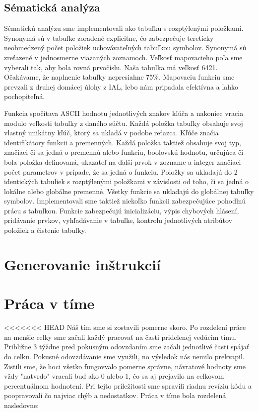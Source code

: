 \documentclass [11pt, a4paper]{article}
\begin{document}
\subsection{Sématická analýza}
Sématickú analýzu sme implementovali ako tabuľku s rozptýlenými položkami. Synonymá sú v tabuľke zoradené explicitne, čo zabezpečuje tereticky neobmedzený počet položiek uchovávateľných tabuľkou symbolov. Synonymá sú zreťazené v jednosmerne viazaných zoznamoch. Veľkosť mapovacieho poľa sme vyberali tak, aby bola rovná prvočíslu. Naša tabuľka má veľkosť 6421. Očakávame, že naplnenie tabuľky nepresiahne 75\%. Mapovaciu funkciu sme prevzali z druhej domácej úlohy z IAL, lebo nám pripadala efektívna a ľahko pochopiteľná. 

Funkcia spočítava ASCII hodnotu jednotlivých znakov kľúča a nakoniec vracia modulo veľkosti tabuľky z daného súčtu. Každá položka tabuľky obsahuje svoj vlastný unikátny kľúč, ktorý sa ukladá v podobe reťazca. Kľúče značia identifikátory funkcii a premenných. Každá položka taktiež obsahuje svoj typ, značiaci či sa jedná o premennú alebo funkciu, boolovskú hodnotu, určujúca či bola položka definovaná, ukazateľ na ďalší prvok v zozname a integer značiaci počet parametrov v prípade, že sa jedná o funkciu. Položky sa ukladajú do 2 identických tabuliek s rozptýlenými položkami v závislosti od toho, či sa jedná o lokálne alebo globálne premenné. Všetky funkcie sa ukladajú do globálnej tabuľky symbolov. Implementovali sme taktiež niekoľko funkcii zabezpečujúce pohodlnú prácu s tabuľkou. Funkcie zabezpečujú inicializáciu, výpis chybových hlásení, pridávanie prvkov, vyhľadávanie v tabuľke, kontrolu jednotlivých atribútov položiek a čistenie tabuľky.

\section{Generovanie inštrukcií}

\section{Práca v tíme}
<<<<<<< HEAD
Náš tím sme si zostavili pomerne skoro. Po rozdelení práce na menšie celky sme začali každý pracovať na časti pridelenej vedúcim tímu. Približne 3 týždne pred pokusným odovzdaním sme začali jednotlivé časti spájať do celku. Pokusné odovzdávanie sme využili, no výsledok nás nemilo prekvapil. Zistili sme, že hoci všetko fungovvalo pomerne správne, návratové hodnoty sme vždy "natvrdo" vracali buď ako 0 alebo 1, čo sa aj prejavilo na celkovom percentuálnom hodnotení. Pri tejto príležitosti sme spravili riadnu revíziu kódu a poopravovali čo najviac chýb a nedostatkov. Práca v tíme bola rozdelená nasledovne:
\end{document}
